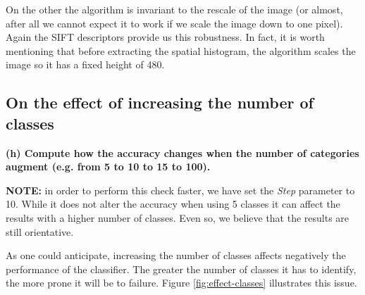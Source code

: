 On the other the algorithm is invariant to the rescale of the image (or almost, after all we cannot expect it to work if we scale the image down to one pixel). Again the SIFT descriptors provide us this robustness. In fact, it is worth mentioning that before extracting the spatial histogram, the algorithm scales the image so it has a fixed height of 480.

\subsection{On the effect of increasing the number of classes}

{\bfseries (h) Compute how the accuracy changes when the number of categories augment (e.g. from 5 to 10 to 15 to 100).}

\textbf{NOTE:} in order to perform this check faster, we have set the \emph{Step} parameter to 10. While it does not alter the accuracy when using 5 classes it can affect the results with a higher number of classes. Even so, we believe that the results are still orientative.

As one could anticipate, increasing the number of classes affects negatively the performance of the classifier. The greater the number of classes it has to identify, the more prone it will be to failure. Figure \ref{fig:effect-classes} illustrates this issue.

